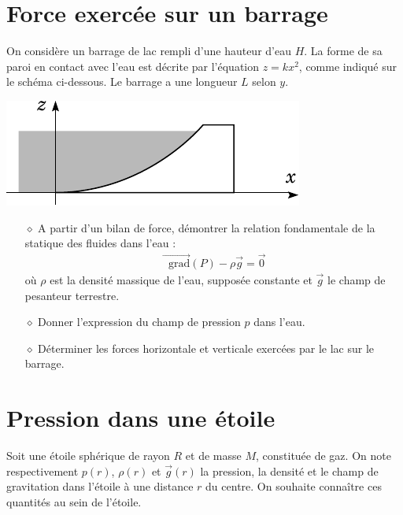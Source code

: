 \documentclass{report}
\newcommand*\grad{\mathop{}\!\mathrm{grad}}
\begin{document}
\newpage

\section*{Force exercée sur un barrage}

On considère un barrage de lac rempli d'une hauteur d'eau $H$. La forme de sa paroi en contact avec l'eau est décrite par l'équation $z=kx^2$, comme indiqué sur le schéma ci-dessous. Le barrage a une longueur $L$ selon $y$.

\begin{center}
	\includegraphics[scale=1]{barrage.pdf}
\end{center}

\begin{itemize}

	\item[$\diamond$] A partir d'un bilan de force, démontrer la relation fondamentale de la statique des fluides dans l'eau : 
	\begin{align*}
		\vec{\grad}(P) - \rho\vec{g}=\vec{0}
	\end{align*}
		où $\rho$ est la densité massique de l'eau, supposée constante et $\vec{g}$ le champ de pesanteur terrestre.
		
		\item[$\diamond$] Donner l'expression du champ de pression $p$ dans l'eau.
		
		\item[$\diamond$] Déterminer les forces horizontale et verticale exercées par le lac sur le barrage.

\end{itemize}

\newpage

\section*{Pression dans une étoile}

Soit une étoile sphérique de rayon $R$ et de masse $M$, constituée de gaz. On note respectivement $p(r)$, $\rho(r)$ et $\vec{g}(r)$ la pression, la densité et le champ de gravitation dans l'étoile à une distance $r$ du centre. On souhaite connaître ces quantités au sein de l'étoile. 
\end{document}
